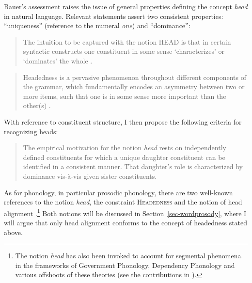 \documentclass[output=paper
 ,nobabel
 ,draftmode
 ,colorlinks, citecolor=brown
]{langscibook}
\begin{document}
Bauer's assessment raises the issue of general properties defining the concept \emph{head} in natural language. Relevant statements assert two consistent properties: ``uniqueness'' (reference to the numeral \emph{one}) and ``dominance'': 

\begin{quote}
    The intuition to be captured with the notion HEAD is that in certain syntactic constructs one constituent in some sense `characterizes' or `dominates' the whole \citep[2]{Zwicky85a}.
\end{quote}

\begin{quote}
    Headedness is a pervasive phenomenon throughout different components of the grammar, which fundamentally encodes an asymmetry between two or more items, such that one is in some sense more important than the other(s) \citep{MoskalSmith2019}.
\end{quote}

\largerpage[-1]
\noindent
With reference to constituent structure, I then propose the following criteria for recognizing heads: 

\begin{quote}
The empirical motivation for the notion \emph{head} rests on independently defined constituents for which a unique daughter constituent can be identified in a consistent manner. That daughter's role is characterized by dominance vis-à-vis given sister constituents.
\end{quote}


\noindent
As for phonology, in particular prosodic phonology, there are two well-known references to the notion \emph{head}, the constraint \textsc{Headedness} \citep{Selkirk1995} and the notion of head alignment \citep{McCarthyPrince1993}.\footnote{The notion \emph{head} has also been invoked to account for segmental phenomena in the frameworks of Government Phonology, Dependency Phonology and various offshoots of these theories (see the contributions in \citealp{CarrEwen2005}).} Both notions will be discussed in Section~\ref{sec-wordprosody}, where I will argue that only head alignment conforms to the concept of headedness stated above. 
\end{document}
